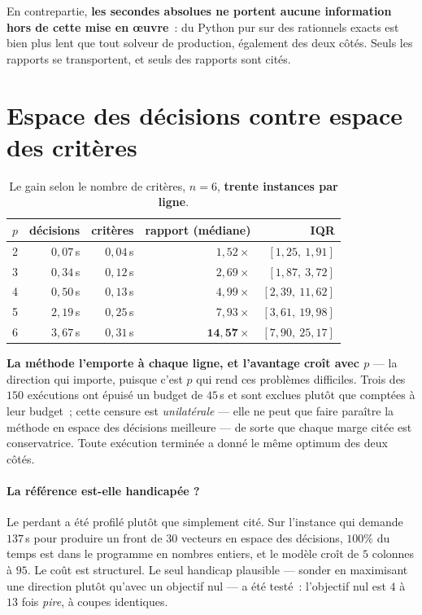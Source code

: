 \documentclass[12pt,a4paper]{report}
\newcommand{\fig}[1]{}
\theoremstyle{plain}
\theoremstyle{definition}
\begin{document}
En contrepartie, \textbf{les secondes absolues ne portent aucune information
hors de cette mise en {\oe}uvre}~: du Python pur sur des rationnels exacts est
bien plus lent que tout solveur de production, également des deux côtés.  Seuls
les rapports se transportent, et seuls des rapports sont cités.

\section{Espace des décisions contre espace des critères}

\begin{table}[h]
\centering
\caption{Le gain selon le nombre de critères, $n = 6$, \textbf{trente
instances par ligne}.}
\label{tab:marge}
\begin{tabular}{crrrr}
\toprule
$p$ & décisions & critères & rapport (médiane) & IQR \\
\midrule
2 & $0{,}07$\,s & $0{,}04$\,s & $1{,}52\times$  & $[1{,}25,\ 1{,}91]$ \\
3 & $0{,}34$\,s & $0{,}12$\,s & $2{,}69\times$  & $[1{,}87,\ 3{,}72]$ \\
4 & $0{,}50$\,s & $0{,}13$\,s & $4{,}99\times$  & $[2{,}39,\ 11{,}62]$ \\
5 & $2{,}19$\,s & $0{,}25$\,s & $7{,}93\times$  & $[3{,}61,\ 19{,}98]$ \\
6 & $3{,}67$\,s & $0{,}31$\,s & $\mathbf{14{,}57\times}$ & $[7{,}90,\ 25{,}17]$ \\
\bottomrule
\end{tabular}
\end{table}

\begin{center}
\fig{r-campaign-margin}
\end{center}

\noindent
\textbf{La méthode l'emporte à chaque ligne, et l'avantage croît avec $p$} ---
la direction qui importe, puisque c'est $p$ qui rend ces problèmes difficiles.
Trois des $150$ exécutions ont épuisé un budget de $45$\,s et sont exclues
plutôt que comptées à leur budget~; cette censure est \emph{unilatérale} --- 
elle ne peut que faire paraître la méthode en espace des décisions meilleure ---
de sorte que chaque marge citée est conservatrice.  Toute exécution terminée a
donné le même optimum des deux côtés.

\paragraph{La référence est-elle handicapée ?}
Le perdant a été profilé plutôt que simplement cité.  Sur l'instance qui
demande $137$\,s pour produire un front de $30$ vecteurs en espace des
décisions, $100\%$ du temps est dans le programme en nombres entiers, et le
modèle croît de $5$ colonnes à $95$.  Le coût est structurel.  Le seul
handicap plausible --- sonder en maximisant une direction plutôt qu'avec un
objectif nul --- a été testé~: l'objectif nul est $4$ à $13$ fois
\emph{pire}, à coupes identiques.
\end{document}
